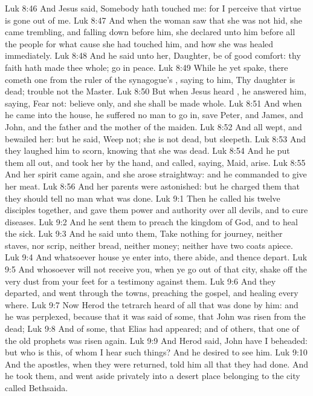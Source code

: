\vs Luk 8:46 And Jesus said, Somebody hath touched me: for I perceive that virtue is gone out of me.
\vs Luk 8:47 And when the woman saw that she was not hid, she came trembling, and falling down before him, she declared unto him before all the people for what cause she had touched him, and how she was healed immediately.
\vs Luk 8:48 And he said unto her, Daughter, be of good comfort: thy faith hath made thee whole; go in peace.
\vs Luk 8:49 While he yet spake, there cometh one from the ruler of the synagogue's , saying to him, Thy daughter is dead; trouble not the Master.
\vs Luk 8:50 But when Jesus heard , he answered him, saying, Fear not: believe only, and she shall be made whole.
\vs Luk 8:51 And when he came into the house, he suffered no man to go in, save Peter, and James, and John, and the father and the mother of the maiden.
\vs Luk 8:52 And all wept, and bewailed her: but he said, Weep not; she is not dead, but sleepeth.
\vs Luk 8:53 And they laughed him to scorn, knowing that she was dead.
\vs Luk 8:54 And he put them all out, and took her by the hand, and called, saying, Maid, arise.
\vs Luk 8:55 And her spirit came again, and she arose straightway: and he commanded to give her meat.
\vs Luk 8:56 And her parents were astonished: but he charged them that they should tell no man what was done.
\vs Luk 9:1 Then he called his twelve disciples together, and gave them power and authority over all devils, and to cure diseases.
\vs Luk 9:2 And he sent them to preach the kingdom of God, and to heal the sick.
\vs Luk 9:3 And he said unto them, Take nothing for  journey, neither staves, nor scrip, neither bread, neither money; neither have two coats apiece.
\vs Luk 9:4 And whatsoever house ye enter into, there abide, and thence depart.
\vs Luk 9:5 And whosoever will not receive you, when ye go out of that city, shake off the very dust from your feet for a testimony against them.
\vs Luk 9:6 And they departed, and went through the towns, preaching the gospel, and healing every where.
\vs Luk 9:7 Now Herod the tetrarch heard of all that was done by him: and he was perplexed, because that it was said of some, that John was risen from the dead;
\vs Luk 9:8 And of some, that Elias had appeared; and of others, that one of the old prophets was risen again.
\vs Luk 9:9 And Herod said, John have I beheaded: but who is this, of whom I hear such things? And he desired to see him.
\vs Luk 9:10 And the apostles, when they were returned, told him all that they had done. And he took them, and went aside privately into a desert place belonging to the city called Bethsaida.
